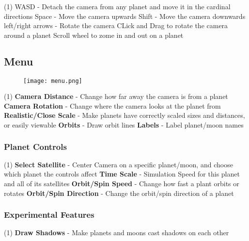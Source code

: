 \documentclass[twoside]{article}
\begin{document}
\begin{tasks}[counter-format=\ ](1)
	\task WASD - Detach the camera from any planet and move it in the cardinal directions
	\task Space - Move the camera upwards
	\task Shift - Move the camera downwards
	\task left/right arrows - Rotate the camera
	\task CLick and Drag to rotate the camera around a planet
	\task Scroll wheel to zome in and out on a planet
\end{tasks}

\newpage

\subsection{Menu}

\begin{figure}[h]
\centering
\texttt{[image: menu.png]}
\end{figure}

\begin{tasks}[counter-format=\ ](1)
	\task \textbf{Camera Distance} - Change how far away the camera is from a planet
	\task \textbf{Camera Rotation} - Change where the camera looks at the planet from
	\task \textbf{Realistic/Close Scale} - Make planets have correctly scaled sizes and distances, or easily viewable
	\task \textbf{Orbits} - Draw orbit lines
	\task \textbf{Labels} - Label planet/moon names
\end{tasks}

\subsubsection{Planet Controls}

\begin{tasks}[counter-format=\ ](1)
	\task \textbf{Select Satellite} - Center Camera on a specific planet/moon, and choose which planet the controls affect
	\task \textbf{Time Scale} - Simulation Speed for this planet and all of its satellites
	\task \textbf{Orbit/Spin Speed} - Change how fast a plant orbits or rotates
	\task \textbf{Orbit/Spin Direction} - Change the orbit/spin direction of a planet
\end{tasks}

\subsubsection{Experimental Features}

\begin{tasks}[counter-format=\ ](1)
	\task \textbf{Draw Shadows} - Make planets and moons cast shadows on each other
\end{tasks}
\end{document}
